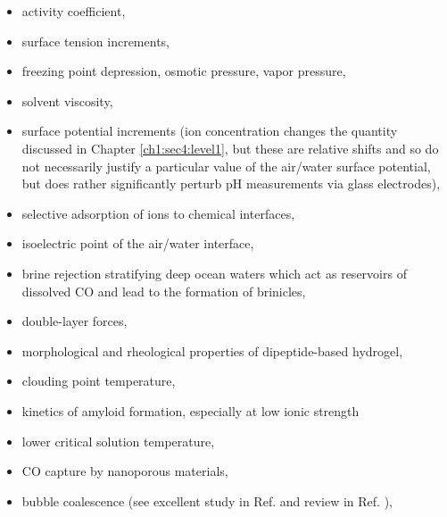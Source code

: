 \begin{intro}
    \begin{itemize}
        \item activity coefficient\cite{xie2013simple},
        \item surface tension increments\cite{bostrom2001surface,marcus2016surftension,pegram2007hofmeister,slavchov2012surface},
        \item freezing point depression, osmotic pressure, vapor pressure\cite{franks2000water},
        \item solvent viscosity\cite{collins2004ions}, 
        \item surface potential increments\cite{marcus2016surftension} (ion concentration changes the quantity discussed in Chapter \ref{ch1:sec4:level1}, but these are relative
        shifts and so do not necessarily justify a particular value of the air/water surface potential, but does rather significantly perturb pH measurements via glass 
        electrodes\cite{bostrom2003hofmeister}), 
        \item selective adsorption of ions to chemical interfaces\cite{carrier2016ionsatowinterface,conboy1997shg_tatb,ben2016interfaces,jungwirth2002airwat,jungwirth2006airwat,luo2015electrobreak,ou2016molecular,pratt1992contact},
        \item isoelectric point of the air/water interface\cite{beattie2009basic,beattie2014surfacid,buch2007surfacid,mishra2012surfacid,vacha2007autoionization},
        \item brine rejection stratifying deep ocean waters which act as reservoirs of dissolved CO\cite{shcherbina2003direct,vrbka2005brine} and lead to the formation of 
        brinicles\cite{frozenplanet,martin1974ice},
        \item double-layer forces\cite{bostrom2003hofmeister,ruckenstein2014specific}, 
        \item morphological and rheological properties of dipeptide-based hydrogel\cite{roy2012dramatic},
        \item clouding point temperature\cite{cremer2009lysozyme}, 
        \item kinetics of amyloid formation, especially at low ionic strength\cite{marek2012ionic}
        \item lower critical solution temperature\cite{zhang2005specific}, 
        \item CO capture by nanoporous materials\cite{shi2016co2capture},
        \item bubble coalescence (see excellent study in Ref. \cite{craig1993effect} and review in Ref. \cite{craig2004bubble}),

\end{itemize}
\end{intro}
